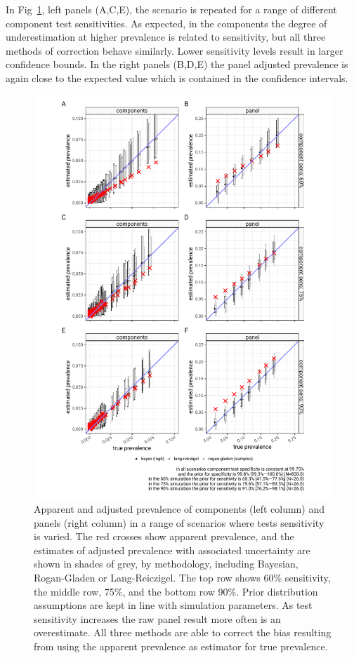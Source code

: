 \documentclass[a4paper, 12pt, twoside]{article}
\begin{document}
In Fig~\ref{fig:B4}, left panels (A,C,E), the scenario is repeated for a range of different component test sensitivities. As expected, in the components the degree of underestimation at higher prevalence is related to sensitivity, but all three methods of correction behave similarly. Lower sensitivity levels result in larger confidence bounds. In the right panels (B,D,E) the panel adjusted prevalence is again close to the expected value which is contained in the confidence intervals.

\begin{figure}[h!]
\centering
  \includegraphics{fig/simulation_result_same_sens_v2}
  \caption{Apparent and adjusted prevalence of components (left column) and panels (right column) in a range of scenarios where tests sensitivity is varied. The red crosses show apparent prevalence, and the estimates of adjusted prevalence with associated uncertainty are shown in shades of grey, by methodology, including Bayesian, Rogan-Gladen or Lang-Reiczigel. The top row shows 60\% sensitivity, the middle row, 75\%, and the bottom row 90\%. Prior distribution assumptions are kept in line with simulation parameters. As test sensitivity increases the raw panel result more often is an overestimate. All three methods are able to correct the bias resulting from using the apparent prevalence as estimator for true prevalence.}
\label{fig:B4}
\end{figure}
\end{document}
